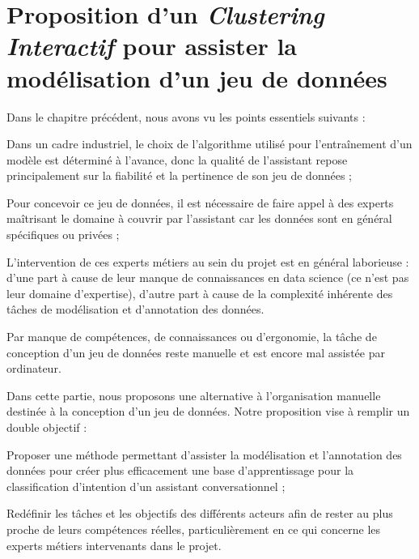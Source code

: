 \chapter{Proposition d'un \textit{Clustering Interactif} pour assister la modélisation d'un jeu de données}
\label{chapter:3-CLUSTERING-INTERACTIF}
	
	Dans le chapitre précédent, nous avons vu les points essentiels suivants :
	\begin{leftBarImportantGreen}
		\begin{todolist}
			\item[\itemok] Dans un cadre industriel, le choix de l'algorithme utilisé pour l’entraînement d'un modèle est déterminé à l'avance, donc la qualité de l'assistant repose principalement sur la fiabilité et la pertinence de son jeu de données ;
			\item[\itemok] Pour concevoir ce jeu de données, il est nécessaire de faire appel à des experts maîtrisant le domaine à couvrir par l'assistant car les données sont en général spécifiques ou privées ;
			\item[\itemok] L'intervention de ces experts métiers au sein du projet est en général laborieuse :
			d'une part à cause de leur manque de connaissances en data science (ce n'est pas leur domaine d'expertise),
			d'autre part à cause de la complexité inhérente des tâches de modélisation et d'annotation des données.
			\item[\itemok] Par manque de compétences, de connaissances ou d'ergonomie, la tâche de conception d'un jeu de données reste manuelle et est encore mal assistée par ordinateur.
		\end{todolist}
	\end{leftBarImportantGreen}
	
	Dans cette partie, nous proposons une alternative à l'organisation manuelle destinée à la conception d'un jeu de données. Notre proposition vise à remplir un double objectif :
	\begin{leftBarImportantRed}
		\begin{todolist}
			\item Proposer une méthode permettant d'assister la modélisation et l'annotation des données pour créer plus efficacement une base d'apprentissage pour la classification d'intention d'un assistant conversationnel ;
			\item Redéfinir les tâches et les objectifs des différents acteurs afin de rester au plus proche de leurs compétences réelles, particulièrement en ce qui concerne les experts métiers intervenants dans le projet.
		\end{todolist}
	\end{leftBarImportantRed}

